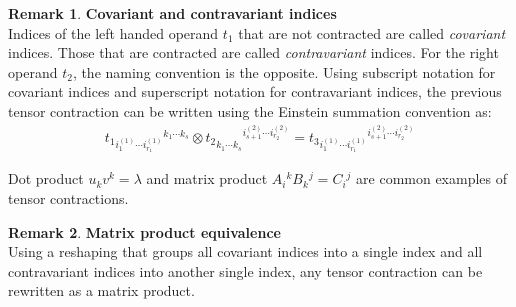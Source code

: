 \documentclass{article}
\theoremstyle{definition}
\newtheorem{remark}{Remark}
\begin{document}
\begin{remark}\textbf{Covariant and contravariant indices}\\
Indices of the left handed operand $t_1$ that are not contracted are called \emph{covariant} indices. Those that are contracted are called \emph{contravariant} indices. For the right operand $t_2$, the naming convention is the opposite. Using subscript notation for covariant indices and superscript notation for contravariant indices, the previous tensor contraction can be written using the Einstein summation convention as:
\begin{gather}
t_1 \hspace{0pt}_{i_1^{(1)} \cdots i_{r_1}^{(1)} } \hspace{0pt}^{ k_1 \cdots k_s} \otimes
t_2 \hspace{0pt}_{ k_1^{\phantom{(}} \cdots k_s^{\phantom{(}}} \hspace{0pt}^{i_{s+1}^{(2)} \cdots i_{r_2}^{(2)}} =
t_3 \hspace{0pt}_ {i_1^{(1)} \cdots i_{r_1}^{(1)} } \hspace{0pt}^{i_{s+1}^{(2)} \cdots i_{r_2}^{(2)}}
\end{gather}
\end{remark}

Dot product $u_k v^k = \lambda $ and matrix product $A_i\hspace{0pt}^k B_k\hspace{0pt}^j = C_i\hspace{0pt}^j$ are common examples of tensor contractions.

\begin{remark}\textbf{Matrix product equivalence}\\
Using a reshaping that groups all covariant indices into a single index and all contravariant indices into another single index, any tensor contraction can be rewritten as a matrix product.
\end{remark}
\end{document}
